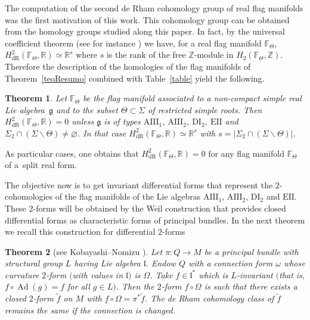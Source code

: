 \documentclass[pdftex]{sigma}
\numberwithin{equation}{section}
\newtheorem{Theorem}{Theorem}[section]
\begin{document}
The computation of the second de Rham cohomology group of real flag manifolds was the first motivation of this work. This cohomology group can be obtained from the homology groups studied along this paper. In fact, by the universal coefficient theorem (see for instance \cite{Ha}) we have, for a real flag manifold $\mathbb{F}_{\Theta }$, $H_{\mathrm{dR}}^{2}(\mathbb{F}_{\Theta },\mathbb{R})\simeq \mathbb{R}^{s}$ where $s$ is the rank of the free $\mathbb{Z}$-module in $H_{2}(\mathbb{F}_{\Theta },\mathbb{Z})$. Therefore the description of the homologies of the flag manifolds of Theorem~\ref{teoResumo} combined with Table~\ref{table} yield the following.

\begin{Theorem}\label{tedeRham}Let $\mathbb{F}_{\Theta }$ be the flag manifold associated to a non-compact simple real Lie algebra~$\mathfrak{g}$ and to the subset $\Theta \subset \Sigma $ of restricted simple roots. Then $H_{\mathrm{dR}}^{2}(\mathbb{F}_{\Theta },\mathbb{R})=0$ unless $\mathfrak{g}$ is of types $\mathrm{AIII_{1}}$, $\mathrm{AIII_{2}}$, $\mathrm{DI_{2}}$, $\mathrm{EII}$ and $\Sigma _{2}\cap (\Sigma \backslash \Theta )\neq \varnothing $. In that case $H_{\mathrm{dR}}^{2}(\mathbb{F}_{\Theta },\mathbb{R})\simeq \mathbb{R}^{s}$ with $s=\vert \Sigma _{2}\cap (\Sigma \backslash \Theta)\vert $.
\end{Theorem}

As particular cases, one obtains that $H_{\mathrm{dR}}^{2}(\mathbb{F}_{\Theta },\mathbb{R})=0$ for any flag manifold $\mathbb{F}_{\Theta }$ of a~split real form.

The objective now is to get invariant differential forms that represent the $2$-cohomologies of the flag manifolds of the Lie algebras $\mathrm{AIII_{1}}$, $\mathrm{AIII_{2}}$, $\mathrm{DI_{2}}$ and $\mathrm{EII}$. These $2$-forms will be obtained by the Weil construction that provides closed differential forms as characteristic forms of principal bundles. In the next theorem we recall this construction for differential $2$-forms

\begin{Theorem}[{see Kobayashi--Nomizu \cite[Chapter XII]{kn}}]\label{teoWeilhomo} Let $\pi\colon Q\rightarrow M$ be a principal bundle with structural group $L$ having Lie algebra $\mathfrak{l}$. Endow $Q$ with a connection form $\omega $ whose curvature $2$-form $($with values in $\mathfrak{l})$ is $\Omega $. Take $f\in \mathfrak{l}^{\ast }$ which is $L$-invariant $($that is, $f\circ \operatorname{Ad} (g) =f$ for all $g\in L)$. Then the $2$-form $f\circ \Omega $ is such that there exists a closed $2$-form $\widetilde{f}$ on $M$ with $f\circ \Omega =\pi ^{\ast }\widetilde{f}$. The de Rham cohomology class of $\widetilde{f}$ remains the same if the connection is changed.
\end{Theorem}
\end{document}
